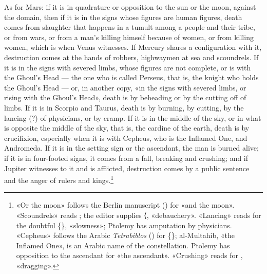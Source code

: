\documentclass[11pt]{article}
\begin{document}
\par As for Mars: if it is in quadrature or opposition to the sun or the moon, against the domain, then if it is in the signs whose figures are human figures, death comes from slaughter that happens in a tumult among a people and their tribe, or from wars, or from a man's killing himself because of women, or from killing women, which is when Venus witnesses. If Mercury shares a configuration with it, destruction comes at the hands of robbers, highwaymen at sea and scoundrels. If it is in the signs with severed limbs, whose figures are not complete, or is with the Ghoul's Head — the one who is called Perseus, that is, the knight who holds the Ghoul's Head — or, in another copy, «in the signs with severed limbs, or rising with the Ghoul's Head», death is by beheading or by the cutting off of limbs. If it is in Scorpio and Taurus, death is by burning, by cutting, by the lancing (?) of physicians, or by cramp. If it is in the middle of the sky, or in what is opposite the middle of the sky, that is, the cardine of the earth, death is by crucifixion, especially when it is with Cepheus, who is the Inflamed One, and Andromeda. If it is in the setting sign or the ascendant, the man is burned alive; if it is in four-footed signs, it comes from a fall, breaking and crushing; and if Jupiter witnesses to it and is afflicted, destruction comes by a public sentence and the anger of rulers and kings.\footnote{«Or the moon» follows the Berlin manuscript () for «and the moon». «Scoundrels» reads ; the editor supplies {\mdseries ⟨}, «debauchery». «Lancing» reads  for the doubtful \{\}, «slowness»; Ptolemy has amputation by physicians. «Cepheus» follows the Arabic \emph{Tetrabiblos} () for \{\}; al-Multahib, «the Inflamed One», is an Arabic name of the constellation. Ptolemy has opposition to the ascendant for «the ascendant». «Crushing» reads  for , «dragging».}\par
\end{document}
